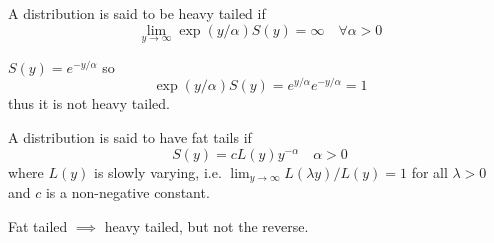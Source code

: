 \documentclass[DIV=14,titlepage=false]{scrreprt}
\begin{document}
\begin{definition}
    A distribution is said to be heavy tailed if
    \[
        \underset{y \to \infty}{\lim} \exp(y/\alpha) S(y) = \infty \quad \forall \alpha > 0
    \]
\end{definition}
\begin{example}
    $S(y) = e^{-y/\alpha}$ so 
    \[
        \exp(y/\alpha) S(y) = e^{y/\alpha} e^{-y/\alpha} = 1
    \]
    thus it is not heavy tailed.
\end{example}
\begin{definition}
    A distribution is said to have fat tails if
    \[
        S(y) = c L(y)y^{-\alpha} \quad \alpha > 0
    \]
    where $L(y)$ is slowly varying, i.e. $\lim_{y \to \infty} L(\lambda y)/L(y) = 1$ for all $\lambda > 0$ and $c$ is a non-negative constant.
\end{definition}
\begin{claim}
    Fat tailed $\implies$ heavy tailed, but not the reverse.
\end{claim}
\end{document}

